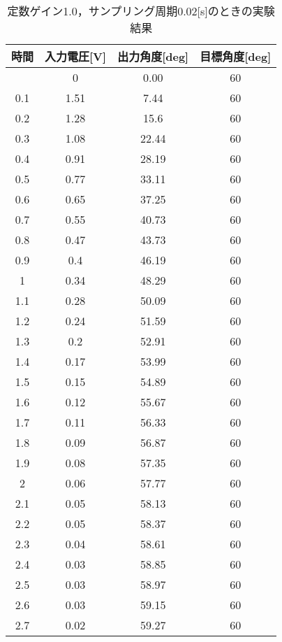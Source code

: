 \begin{longtable}[c]{|c|c|c|c|}
  \caption{定数ゲイン1.0，サンプリング周期0.02[s]のときの実験結果}
  \label{tab2} \\
  \hline
   時間& 	入力電圧[V]&	出力角度[deg]&	目標角度[deg] \\ \hline \hline \endfirsthead 
\hline \endhead
\hline \endfoot
\hline \endlastfoot
   0   & 	0    &  0.00  &  60 \\ \hline 
   0.1 & 	1.51 & 	7.44  &  60 \\ \hline 
   0.2 & 	1.28 & 	15.6  & 60  \\ \hline 
   0.3 & 	1.08 & 	22.44 & 60  \\ \hline 
   0.4 & 	0.91 & 	28.19 & 60  \\ \hline 
   0.5 & 	0.77 & 	33.11 & 60  \\ \hline 
   0.6 & 	0.65 & 	37.25 & 60  \\ \hline 
   0.7 & 	0.55 & 	40.73 & 60  \\ \hline 
   0.8 & 	0.47 & 	43.73 & 60  \\ \hline 
   0.9 & 	0.4  & 	46.19 & 60  \\ \hline 
   1   & 	0.34 & 	48.29 & 60  \\ \hline 
   1.1 & 	0.28 & 	50.09 & 60  \\ \hline 
   1.2 & 	0.24 & 	51.59 & 60  \\ \hline 
   1.3 & 	0.2  & 	52.91 & 60  \\ \hline 
   1.4 & 	0.17 & 	53.99 & 60  \\ \hline 
   1.5 & 	0.15 & 	54.89 & 60  \\ \hline 
   1.6 & 	0.12 & 	55.67 & 60  \\ \hline 
   1.7 & 	0.11 & 	56.33 & 60  \\ \hline 
   1.8 & 	0.09 & 	56.87 & 60  \\ \hline 
   1.9 & 	0.08 & 	57.35 & 60  \\ \hline 
   2   & 	0.06 & 	57.77 & 60  \\ \hline 
   2.1 & 	0.05 & 	58.13 & 60  \\ \hline 
   2.2 & 	0.05 & 	58.37 & 60  \\ \hline 
   2.3 & 	0.04 & 	58.61 & 60  \\ \hline 
   2.4 & 	0.03 & 	58.85 & 60  \\ \hline 
   2.5 & 	0.03 & 	58.97 & 60  \\ \hline 
   2.6 & 	0.03 & 	59.15 & 60  \\ \hline 
   2.7 & 	0.02 & 	59.27 & 60  \\ \hline 

\end{longtable}

